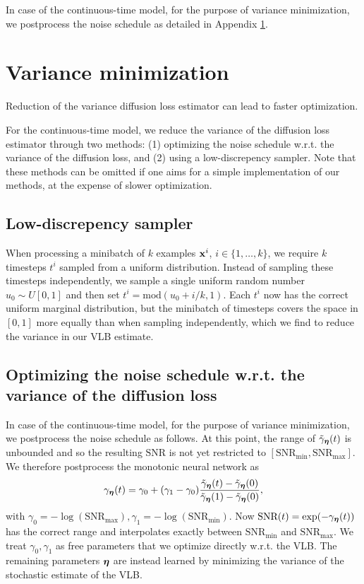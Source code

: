 \documentclass{article}
\newcommand{\snr}{\text{SNR}}
\newcommand{\snrmin}{\text{SNR}_{\text{min}}}
\newcommand{\snrmax}{\text{SNR}_{\text{max}}}
\begin{document}
In case of the continuous-time model, for the purpose of variance minimization, we postprocess the noise schedule as detailed in Appendix \ref{app:variance_minimization}.

\section{Variance minimization}
\label{app:variance_minimization}

Reduction of the variance diffusion loss estimator can lead to faster optimization. 

For the continuous-time model, we reduce the variance of the diffusion loss estimator through two methods: (1) optimizing the noise schedule w.r.t. the variance of the diffusion loss, and (2) using a low-discrepency sampler. Note that these methods can be omitted if one aims for a simple implementation of our methods, at the expense of slower optimization.

\subsection{Low-discrepency sampler}
\label{sec:lowdisc}
When processing a minibatch of $k$ examples ${\mathbf{x}}^{i}$, $i \in \{1,\ldots,k\}$, we require $k$ timesteps $t^{i}$ sampled from a uniform distribution. Instead of sampling these timesteps independently, we sample a single uniform random number $u_{0} \sim U[0,1]$ and then set $t^{i} = \text{mod}(u_{0} + i/k, 1)$. Each $t^{i}$ now has the correct uniform marginal distribution, but the minibatch of timesteps covers the space in $[0,1]$ more equally than when sampling independently, which we find to reduce the variance in our VLB estimate.

\subsection{Optimizing the noise schedule w.r.t. the variance of the diffusion loss}
In case of the continuous-time model, for the purpose of variance minimization, we postprocess the noise schedule as follows. At this point, the range of $\tilde{\gamma}_{{\boldsymbol{\eta}}}(t)$ is unbounded and so the resulting $\snr$ is not yet restricted to $[\snrmin,\snrmax]$. We therefore postprocess the monotonic neural network as
\begin{align}
\gamma_{{\boldsymbol{\eta}}}(t) = \gamma_0 + (\gamma_1 - \gamma_0)\frac{\tilde{\gamma}_{{\boldsymbol{\eta}}}(t) - \tilde{\gamma}_{{\boldsymbol{\eta}}}(0)}{\tilde{\gamma}_{{\boldsymbol{\eta}}}(1) - \tilde{\gamma}_{{\boldsymbol{\eta}}}(0)},
\end{align}
with $\gamma_0 = -\log(\snrmax), \gamma_1 = -\log(\snrmin)$. Now $\snr(t) = \exp(-\gamma_{\boldeta}(t))$ has the correct range and interpolates exactly between $\snrmin$ and $\snrmax$. We treat $\gamma_0, \gamma_1$ as free parameters that we optimize directly w.r.t. the VLB. The remaining parameters ${\boldsymbol{\eta}}$ are instead learned by minimizing the variance of the stochastic estimate of the VLB.
\end{document}
